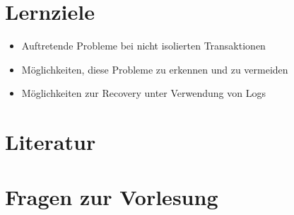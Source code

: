\section*{Lernziele}
\begin{itemize}
	\item Auftretende Probleme bei nicht isolierten Transaktionen
	\item Möglichkeiten, diese Probleme zu erkennen und zu vermeiden
	\item Möglichkeiten zur Recovery unter Verwendung von Logs
\end{itemize}


\section*{Literatur}



\BerensonNintyFive

\section{Fragen zur Vorlesung}

